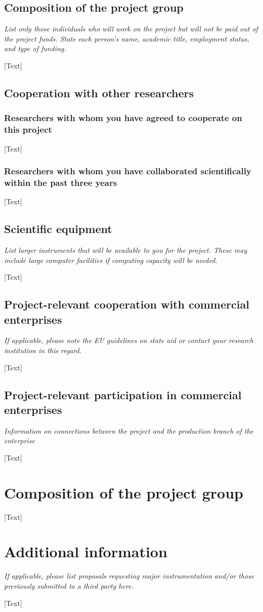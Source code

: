 \documentclass[red]{dfg_proposal_en}
\begin{document}
\subsection{Composition of the project group}
\textit{List only those individuals who will work on the project but will not be paid out of the project funds. State each person’s name, academic title, employment status, and type of funding.}

[Text]

\subsection{Cooperation with other researchers}

\subsubsection{Researchers with whom you have agreed to cooperate on this project}
[Text]

\subsubsection{Researchers with whom you have collaborated scientifically within the past three years}
[Text]

\subsection{Scientific equipment}
\textit{List larger instruments that will be available to you for the project. These may include large computer facilities if computing capacity will be needed. }

[Text]

\subsection{Project-relevant cooperation with commercial enterprises}
\textit{If applicable, please note the EU guidelines on state aid or contact your research institution in this regard.}

[Text]

\subsection{Project-relevant participation in commercial enterprises}
\textit{Information on connections between the project and the production branch of the enterprise}

[Text]

\section{Composition of the project group}
[Text]

\section{Additional information}  %
\textit{If applicable, please list proposals requesting major instrumentation and/or those previously submitted to a third party here.}

[Text]
\end{document}
